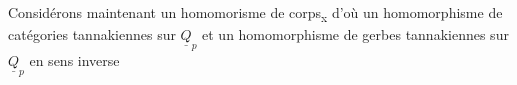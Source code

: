  Considérons maintenant un homomorisme de corps\textsubscript{x}
d'où un homomorphisme de catégories tannakiennes sur $\underline{Q}_p$
et un homomorphisme de gerbes tannakiennes sur $\underline{Q}_p$ en sens inverse


